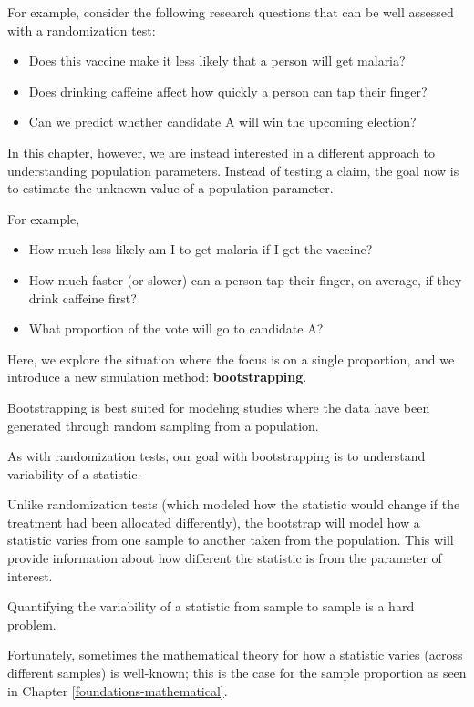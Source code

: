 \documentclass[
  10pt,
  openany]{book}
\providecommand{\tightlist}{%
  \setlength{\itemsep}{0pt}\setlength{\parskip}{0pt}}
\begin{document}
For example, consider the following research questions that can be well assessed with a randomization test:

\begin{itemize}
\tightlist
\item
  Does this vaccine make it less likely that a person will get malaria?
\item
  Does drinking caffeine affect how quickly a person can tap their finger?
\item
  Can we predict whether candidate A will win the upcoming election?
\end{itemize}

In this chapter, however, we are instead interested in a different approach to understanding population parameters.
Instead of testing a claim, the goal now is to estimate the unknown value of a population parameter.

For example,

\begin{itemize}
\tightlist
\item
  How much less likely am I to get malaria if I get the vaccine?
\item
  How much faster (or slower) can a person tap their finger, on average, if they drink caffeine first?
\item
  What proportion of the vote will go to candidate A?
\end{itemize}

Here, we explore the situation where the focus is on a single proportion, and we introduce a new simulation method: \textbf{bootstrapping}.

Bootstrapping is best suited for modeling studies where the data have been generated through random sampling from a population.

As with randomization tests, our goal with bootstrapping is to understand variability of a statistic.

Unlike randomization tests (which modeled how the statistic would change if the treatment had been allocated differently), the bootstrap will model how a statistic varies from one sample to another taken from the population.
This will provide information about how different the statistic is from the parameter of interest.

Quantifying the variability of a statistic from sample to sample is a hard problem.

Fortunately, sometimes the mathematical theory for how a statistic varies (across different samples) is well-known; this is the case for the sample proportion as seen in Chapter \ref{foundations-mathematical}.
\end{document}
